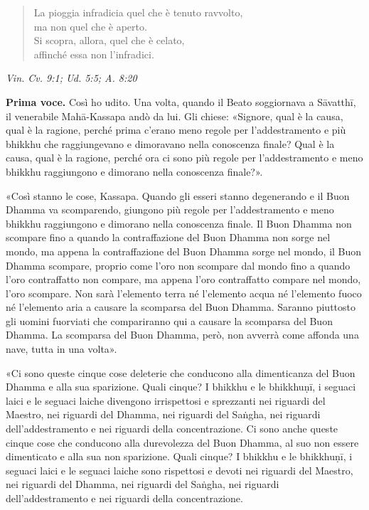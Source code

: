 \begin{quotation}
La pioggia infradicia quel che è tenuto ravvolto, \\
ma non quel che è aperto. \\
Si scopra, allora, quel che è celato, \\
affinché essa non l’infradici.
\end{quotation}

\emph{Vin. Cv. 9:1; Ud. 5:5; A. 8:20}


\textbf{Prima voce.} Così ho udito. Una volta, quando il Beato soggiornava a
Sāvatthī, il venerabile Mahā-Kassapa andò da lui. Gli chiese: «Signore,
qual è la causa, qual è la ragione, perché prima c’erano meno regole per
l’addestramento e più bhikkhu che raggiungevano e dimoravano nella
conoscenza finale? Qual è la causa, qual è la ragione, perché ora ci
sono più regole per l’addestramento e meno bhikkhu raggiungono e
dimorano nella conoscenza finale?».


«Così stanno le cose, Kassapa. Quando gli esseri stanno degenerando e il
Buon Dhamma va scomparendo, giungono più regole per l’addestramento e
meno bhikkhu raggiungono e dimorano nella conoscenza finale. Il Buon
Dhamma non scompare fino a quando la contraffazione del Buon Dhamma non
sorge nel mondo, ma appena la contraffazione del Buon Dhamma sorge nel
mondo, il Buon Dhamma scompare, proprio come l’oro non scompare dal
mondo fino a quando l’oro contraffatto non compare, ma appena l’oro
contraffatto compare nel mondo, l’oro scompare. Non sarà l’elemento
terra né l’elemento acqua né l’elemento fuoco né l’elemento aria a
causare la scomparsa del Buon Dhamma. Saranno piuttosto gli uomini
fuorviati che compariranno qui a causare la scomparsa del Buon Dhamma.
La scomparsa del Buon Dhamma, però, non avverrà come affonda una nave,
tutta in una volta».


«Ci sono queste cinque cose deleterie che conducono alla dimenticanza
del Buon Dhamma e alla sua sparizione. Quali cinque? I bhikkhu e le
bhikkhuṇī, i seguaci laici e le seguaci laiche divengono irrispettosi e
sprezzanti nei riguardi del Maestro, nei riguardi del Dhamma, nei
riguardi del Saṅgha, nei riguardi dell’addestramento e nei riguardi
della concentrazione. Ci sono anche queste cinque cose che conducono
alla durevolezza del Buon Dhamma, al suo non essere dimenticato e alla
sua non sparizione. Quali cinque? I bhikkhu e le bhikkhuṇī, i seguaci
laici e le seguaci laiche sono rispettosi e devoti nei riguardi del
Maestro, nei riguardi del Dhamma, nei riguardi del Saṅgha, nei riguardi
dell’addestramento e nei riguardi della concentrazione.


